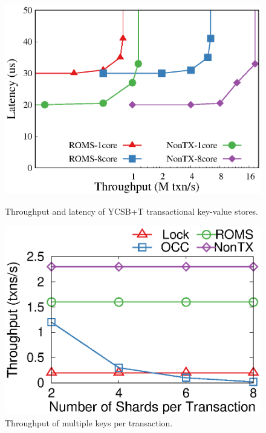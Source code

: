 \begin{figure}[t]
	\centering
	\captionsetup{font=small,margin=0.5em}
	\begin{minipage}[t]{.24\textwidth}
		\centering
		\includegraphics[width=\textwidth]{gnuplot/ycsb.eps}
		\caption{Throughput and latency of YCSB+T transactional key-value stores.}
		\label{fig:ycsb}
	\end{minipage}
	\begin{minipage}[t]{.23\textwidth}
		\centering
		\includegraphics[width=\textwidth]{gnuplot/multishard.eps}
		\caption{Throughput of multiple keys per transaction.}
		\label{fig:multishard}
	\end{minipage}
\end{figure}



